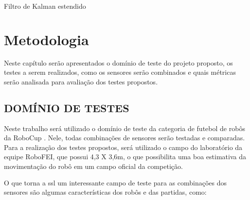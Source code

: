 \documentclass[acronym, symbols, table]{fei}
\begin{document}
			\begin{algorithm}
					\caption{Filtro de Kalman estendido}\label{alg:ekf_algoritmo}
			\end{algorithm}
			
\chapter{Metodologia}

	Neste capítulo serão apresentados o domínio de teste do projeto proposto, os testes a serem realizados, como os sensores serão combinados e quais métricas serão analisada para avaliação dos testes propostos.
	
	\section{DOMÍNIO DE TESTES}
	
		Neste trabalho será utilizado o domínio de teste da categoria  de futebol de robôs da RoboCup \cite{RoboCup}. Nele, todas combinações de sensores serão testadas e comparadas. Para a realização dos testes propostos, será utilizado o campo do laboratório da equipe RoboFEI, que possui 4,3 X 3,6m, o que possibilita uma boa estimativa da movimentação do robô em um campo oficial da competição.
		
		O que torna a \acrshort{ssl} um interessante campo de teste para as combinações dos sensores são algumas características dos robôs e das partidas, como:
		
\end{document}
